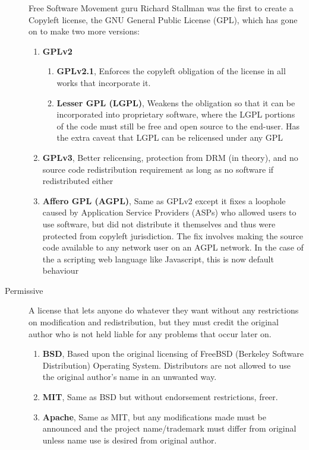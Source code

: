 \begin{description}
{Free Software Movement guru Richard Stallman was the first to create a Copyleft license, the GNU \citep{stallman1998gnu} General Public License (GPL), which has gone on to make two more versions:
	\begin{enumerate}
	\item{\textbf{GPLv2}
		\begin{enumerate}
		\item{\textbf{GPLv2.1}, Enforces the copyleft obligation of the license in all works that incorporate it.}
		\item{\textbf{Lesser GPL (LGPL)}, Weakens the obligation so that it can be incorporated into proprietary software, where the LGPL portions of the code must still be free and open source to the end-user. Has the extra caveat that LGPL can be relicensed under any GPL}
		\end{enumerate}
	}
	\item{\textbf{GPLv3}, Better relicensing, protection from DRM (in theory), and no source code redistribution requirement as long as no software if redistributed either \citep{gplv3}}
	\item{\textbf{Affero GPL (AGPL)}, Same as GPLv2 except it fixes a loophole caused by Application Service Providers (ASPs) who allowed users to use software, but did not distribute it themselves and thus were protected from copyleft jurisdiction. The fix involves making the source code available to any network user on an AGPL network. In the case of the a scripting web language like Javascript, this is now default behaviour\citep{agplv3}}
	\end{enumerate}
	}
\item[Permissive]{
A license that lets anyone do whatever they want without any restrictions on modification and redistribution, but they must credit the original author who is not held liable for any problems that occur later on.
	\begin{enumerate}
	\item{\textbf{BSD}, Based upon the original licensing of FreeBSD (Berkeley Software Distribution) Operating System. Distributors are not allowed to use the original author's name in an unwanted way.\citep{bsd}}
	\item{\textbf{MIT}, Same as BSD but without endorsement restrictions, freer.\citep{mit}}
	\item{\textbf{Apache}, Same as MIT, but any modifications made must be announced and the project name/trademark must differ from original unless name use is desired from original author.}
	\end{enumerate}
}
\end{description}


